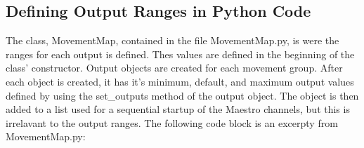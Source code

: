\documentclass[letterpaper,10pt,english]{sphinxmanual}
\begin{document}
\subsection{Defining Output Ranges in Python Code}
\label{\detokenize{range:defining-output-ranges-in-python-code}}\label{\detokenize{range:pyrange}}
\sphinxAtStartPar
The class, MovementMap, contained in the file MovementMap.py, is were the ranges for
each output is defined. Thes values are defined in the beginning of the class’
constructor. Output objects are created for each movement group. After each object is
created, it has it’s minimum, default, and maximum output values defined by using the
set\_outputs method of the output object. The object is then added to a list used for
a sequential startup of the Maestro channels, but this is irrelavant to the output
ranges. The following code block is an excerpty from MovementMap.py:

\begin{sphinxVerbatim}[commandchars=\\\{\},numbers=left,firstnumber=78,stepnumber=1]
    \PYG{p}{[}\PYG{p}{]} \PYG{p}{[} \PYG{p}{]}
\PYG{p}{[}\PYG{p}{]} \PYG{p}{[}\PYG{p}{]} \PYG{p}{[}\PYG{p}{]}

    \PYG{p}{[} \PYG{p}{]}
\PYG{p}{[} \PYG{p}{]} \PYG{p}{[} \PYG{p}{]} \PYG{p}{[} \PYG{p}{]}
\end{sphinxVerbatim}
\end{document}
